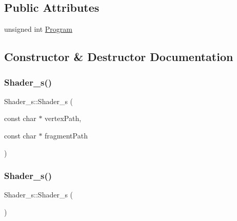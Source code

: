 \subsection*{Public Attributes}
\begin{DoxyCompactItemize}
\item 
unsigned int \mbox{\hyperlink{class_shader__s_a56ceb9f16ece43969110b5b23eb31956}{Program}}
\end{DoxyCompactItemize}


\subsection{Constructor \& Destructor Documentation}
\mbox{\label{class_shader__s_a564b38d9a18dd88011f61410fbbc1135}} 
\subsubsection{\texorpdfstring{Shader\+\_\+s()}{Shader\_s()}\hspace{0.1cm}{\footnotesize\ttfamily [1/2]}}
{\footnotesize\ttfamily Shader\+\_\+s\+::\+Shader\+\_\+s (\begin{DoxyParamCaption}\item[{const char $\ast$}]{vertex\+Path,  }\item[{const char $\ast$}]{fragment\+Path }\end{DoxyParamCaption})\hspace{0.3cm}{\ttfamily [inline]}}

\mbox{\label{class_shader__s_a197c14ea44e43468e43410c3ea47990c}} 
\subsubsection{\texorpdfstring{Shader\+\_\+s()}{Shader\_s()}\hspace{0.1cm}{\footnotesize\ttfamily [2/2]}}
{\footnotesize\ttfamily Shader\+\_\+s\+::\+Shader\+\_\+s (\begin{DoxyParamCaption}{ }\end{DoxyParamCaption})\hspace{0.3cm}{\ttfamily [inline]}}



